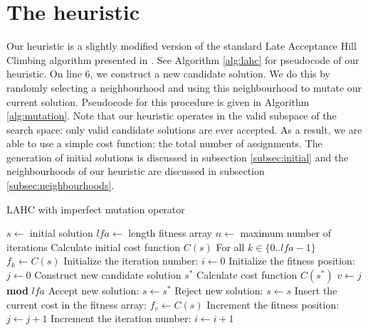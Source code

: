 \documentclass[]{article}
\begin{document}
\section{The heuristic}
Our heuristic is a slightly modified version of the standard Late Acceptance Hill Climbing algorithm presented in \cite{burke2012late}. See Algorithm \ref{alg:lahc} for pseudocode of our heuristic. On line 6, we construct a new candidate solution. We do this by randomly selecting a neighbourhood and using this neighbourhood to mutate our current solution. Pseudocode for this procedure is given in Algorithm \ref{alg:mutation}. Note that our heuristic operates in the valid subspace of the search space: only valid candidate solutions are ever accepted. As a result, we are able to use a simple cost function: the total number of assignments.
The generation of initial solutions is discussed in subsection \ref{subsec:initial} and the neighbourhoods of our heuristic are discussed in subsection \ref{subsec:neighbourhoods}.

\begin{algorithm}                      %
	\caption{LAHC with imperfect mutation operator}%
	\label{alg:lahc}                           %
	\begin{algorithmic}[1]                    %
		\REQUIRE $s \leftarrow$ initial solution
		\REQUIRE $lfa \leftarrow$ length fitness array
		\REQUIRE $n \leftarrow$ maximum number of iterations
		\STATE Calculate initial cost function $C(s)$
		\STATE For all $k \in \{0..lfa-1\}$ $f_k \leftarrow C(s)$
		\STATE Initialize the iteration number: $i \leftarrow 0$
		\STATE Initialize the fitness position: $j \leftarrow 0$
		\STATE Construct new candidate solution $s^*$
		\STATE Calculate cost function $C(s^*)$
		\STATE $v \leftarrow j$ \textbf{mod} $lfa$
		\STATE Accept new solution: $s \leftarrow s^*$
		\ELSE
		\STATE Reject new solution: $s \leftarrow s$
		\ENDIF
		\STATE Insert the current cost in the fitness array: $f_v \leftarrow C(s)$
		\STATE Increment the fitness position: $j \leftarrow j+1$
		\ENDIF
		\STATE Increment the iteration number: $i \leftarrow i+1$
		\ENDWHILE
	\end{algorithmic}
\end{algorithm}
\end{document}
